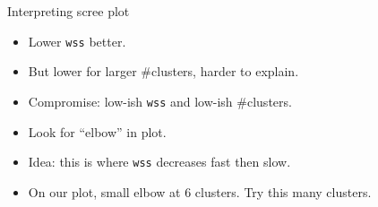 \documentclass[ignorenonframetext,]{beamer}
\begin{document}
\begin{frame}[fragile]{Interpreting scree plot}
\protect\hypertarget{interpreting-scree-plot}{}

\begin{itemize}
\item
  Lower \texttt{wss} better.
\item
  But lower for larger \#clusters, harder to explain.
\item
  Compromise: low-ish \texttt{wss} and low-ish \#clusters.
\item
  Look for ``elbow'' in plot.
\item
  Idea: this is where \texttt{wss} decreases fast then slow.
\item
  On our plot, small elbow at 6 clusters. Try this many clusters.
\end{itemize}

\end{frame}
\end{document}
